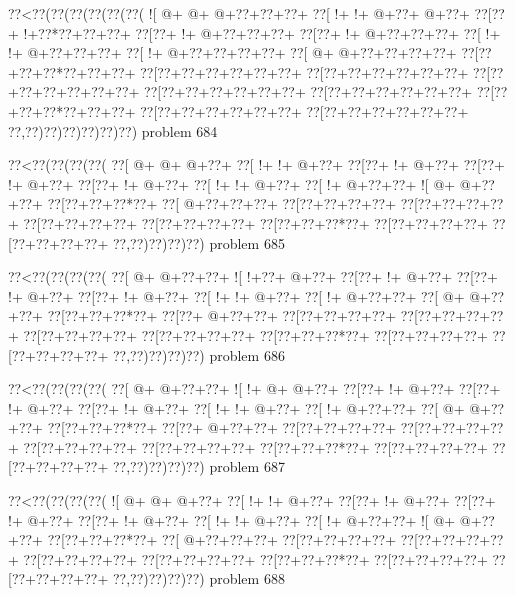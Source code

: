 \vbox{\vbox{\goo
\0??<\0??(\0??(\0??(\0??(\0??(\0??(
\- ![\- @+\- @+\- @+\0??+\0??+\0??+
\0??[\- !+\- !+\- @+\0??+\- @+\0??+
\0??[\0??+\- !+\0??*\0??+\0??+\0??+
\0??[\0??+\- !+\- @+\0??+\0??+\0??+
\0??[\0??+\- !+\- @+\0??+\0??+\0??+
\0??[\- !+\- !+\- @+\0??+\0??+\0??+
\0??[\- !+\- @+\0??+\0??+\0??+\0??+
\0??[\- @+\- @+\0??+\0??+\0??+\0??+
\0??[\0??+\0??+\0??*\0??+\0??+\0??+
\0??[\0??+\0??+\0??+\0??+\0??+\0??+
\0??[\0??+\0??+\0??+\0??+\0??+\0??+
\0??[\0??+\0??+\0??+\0??+\0??+\0??+
\0??[\0??+\0??+\0??+\0??+\0??+\0??+
\0??[\0??+\0??+\0??+\0??+\0??+\0??+
\0??[\0??+\0??+\0??*\0??+\0??+\0??+
\0??[\0??+\0??+\0??+\0??+\0??+\0??+
\0??[\0??+\0??+\0??+\0??+\0??+\0??+
\0??,\0??)\0??)\0??)\0??)\0??)\0??)
}
\hfil problem 684\hfil\break
}

\vbox{\vbox{\goo
\0??<\0??(\0??(\0??(\0??(
\0??[\- @+\- @+\- @+\0??+
\0??[\- !+\- !+\- @+\0??+
\0??[\0??+\- !+\- @+\0??+
\0??[\0??+\- !+\- @+\0??+
\0??[\0??+\- !+\- @+\0??+
\0??[\- !+\- !+\- @+\0??+
\0??[\- !+\- @+\0??+\0??+
\- ![\- @+\- @+\0??+\0??+
\0??[\0??+\0??+\0??*\0??+
\0??[\- @+\0??+\0??+\0??+
\0??[\0??+\0??+\0??+\0??+
\0??[\0??+\0??+\0??+\0??+
\0??[\0??+\0??+\0??+\0??+
\0??[\0??+\0??+\0??+\0??+
\0??[\0??+\0??+\0??*\0??+
\0??[\0??+\0??+\0??+\0??+
\0??[\0??+\0??+\0??+\0??+
\0??,\0??)\0??)\0??)\0??)
}
\hfil problem 685\hfil\break
}

\vbox{\vbox{\goo
\0??<\0??(\0??(\0??(\0??(
\0??[\- @+\- @+\0??+\0??+
\- ![\- !+\0??+\- @+\0??+
\0??[\0??+\- !+\- @+\0??+
\0??[\0??+\- !+\- @+\0??+
\0??[\0??+\- !+\- @+\0??+
\0??[\- !+\- !+\- @+\0??+
\0??[\- !+\- @+\0??+\0??+
\0??[\- @+\- @+\0??+\0??+
\0??[\0??+\0??+\0??*\0??+
\0??[\0??+\- @+\0??+\0??+
\0??[\0??+\0??+\0??+\0??+
\0??[\0??+\0??+\0??+\0??+
\0??[\0??+\0??+\0??+\0??+
\0??[\0??+\0??+\0??+\0??+
\0??[\0??+\0??+\0??*\0??+
\0??[\0??+\0??+\0??+\0??+
\0??[\0??+\0??+\0??+\0??+
\0??,\0??)\0??)\0??)\0??)
}
\hfil problem 686\hfil\break
}

\vbox{\vbox{\goo
\0??<\0??(\0??(\0??(\0??(
\0??[\- @+\- @+\0??+\0??+
\- ![\- !+\- @+\- @+\0??+
\0??[\0??+\- !+\- @+\0??+
\0??[\0??+\- !+\- @+\0??+
\0??[\0??+\- !+\- @+\0??+
\0??[\- !+\- !+\- @+\0??+
\0??[\- !+\- @+\0??+\0??+
\0??[\- @+\- @+\0??+\0??+
\0??[\0??+\0??+\0??*\0??+
\0??[\0??+\- @+\0??+\0??+
\0??[\0??+\0??+\0??+\0??+
\0??[\0??+\0??+\0??+\0??+
\0??[\0??+\0??+\0??+\0??+
\0??[\0??+\0??+\0??+\0??+
\0??[\0??+\0??+\0??*\0??+
\0??[\0??+\0??+\0??+\0??+
\0??[\0??+\0??+\0??+\0??+
\0??,\0??)\0??)\0??)\0??)
}
\hfil problem 687\hfil\break
}

\vbox{\vbox{\goo
\0??<\0??(\0??(\0??(\0??(
\- ![\- @+\- @+\- @+\0??+
\0??[\- !+\- !+\- @+\0??+
\0??[\0??+\- !+\- @+\0??+
\0??[\0??+\- !+\- @+\0??+
\0??[\0??+\- !+\- @+\0??+
\0??[\- !+\- !+\- @+\0??+
\0??[\- !+\- @+\0??+\0??+
\- ![\- @+\- @+\0??+\0??+
\0??[\0??+\0??+\0??*\0??+
\0??[\- @+\0??+\0??+\0??+
\0??[\0??+\0??+\0??+\0??+
\0??[\0??+\0??+\0??+\0??+
\0??[\0??+\0??+\0??+\0??+
\0??[\0??+\0??+\0??+\0??+
\0??[\0??+\0??+\0??*\0??+
\0??[\0??+\0??+\0??+\0??+
\0??[\0??+\0??+\0??+\0??+
\0??,\0??)\0??)\0??)\0??)
}
\hfil problem 688\hfil\break
}

